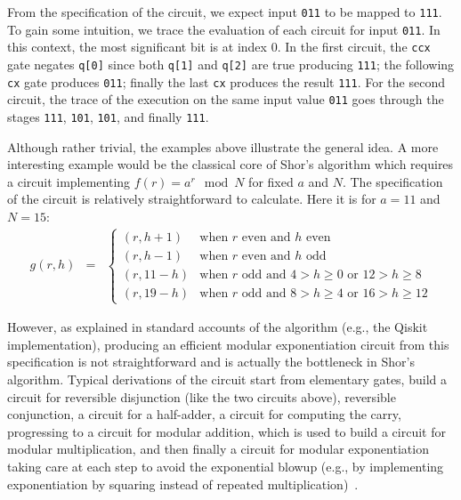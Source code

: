 From the specification of the circuit, we expect input \verb|011| to be mapped
to \verb|111|. To gain some intuition, we trace the evaluation of each circuit for
input \verb|011|. In this context, the most significant bit is at index 0. In
the first circuit, the \verb|ccx| gate negates \verb|q[0]| since both \verb|q[1]| and
\verb|q[2]| are true producing \verb|111|; the following \verb|cx| gate produces
\verb|011|; finally the last \verb|cx| produces the result \verb|111|. For the
second circuit, the trace of the execution on the same input value \verb|011| goes through the stages \verb|111|, \verb|101|, \verb|101|, and finally \verb|111|.

Although rather trivial, the examples above illustrate the general idea. A more
interesting example would be the classical core of Shor's algorithm which
requires a circuit implementing $f(r) = a^{r} \mod N$ for fixed $a$ and $N$. The
specification of the circuit is relatively straightforward to calculate. Here it
is for $a=11$ and $N=15$:
\[\begin{array}{rcll}
g(r,h) &=& \left\{ \begin{array}{ll}
                     (r,h+1) & \mbox{when~$r$~even~and~$h$~even} \\
                     (r,h-1) & \mbox{when~$r$~even~and~$h$~odd} \\
                     (r,11-h) & \mbox{when~$r$~odd~and~$4 > h \geq 0$~or~$12 > h \geq 8$} \\
                     (r,19-h) & \mbox{when~$r$~odd~and~$8 > h \geq 4$~or~$16 > h \geq 12$}
                                \end{array}\right.
\end{array}\]

\noindent However, as explained in standard accounts of the algorithm (e.g., the
Qiskit implementation), producing an efficient modular exponentiation circuit
from this specification is not straightforward and is actually the bottleneck in
Shor’s algorithm. Typical derivations of the circuit start from elementary
gates, build a circuit for reversible disjunction (like the two circuits above),
reversible conjunction, a circuit for a half-adder, a circuit for computing the
carry, progressing to a circuit for modular addition, which is used to build a
circuit for modular multiplication, and then finally a circuit for modular
exponentiation taking care at each step to avoid the exponential blowup (e.g.,
by implementing exponentiation by squaring instead of repeated
multiplication)~\cite{shorefficient}.

